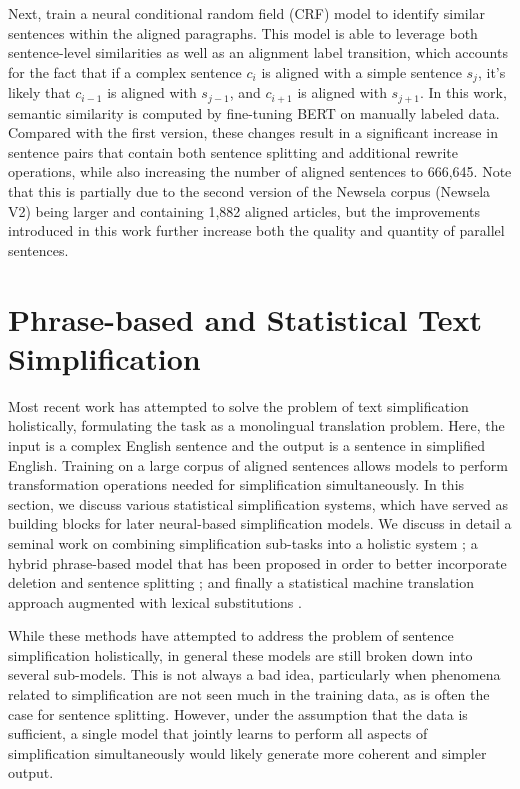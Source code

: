 \documentclass[thesis.tex]{subfiles}
\begin{document}
Next, \cite{jiang2020neural} train a neural conditional random field (CRF) model to identify similar sentences within the aligned paragraphs. This model is able to leverage both sentence-level similarities as well as an alignment label transition, which accounts for the fact that if a complex sentence $c_i$ is aligned with a simple sentence $s_j$, it's likely that $c_{i-1}$ is aligned with $s_{j-1}$, and $c_{i+1}$ is aligned with $s_{j+1}$. In this work, semantic similarity is computed by fine-tuning BERT \citep{devlin2019bert} on manually labeled data. Compared with the first version, these changes result in a significant increase in sentence pairs that contain both sentence splitting and additional rewrite operations, while also increasing the number of aligned sentences to 666,645. Note that this is partially due to the second version of the Newsela corpus (Newsela V2) being larger and containing 1,882 aligned articles, but the improvements introduced in this work further increase both the quality and quantity of parallel sentences.

\section{Phrase-based and Statistical Text Simplification} \label{sec:statistical_review}

Most recent work has attempted to solve the problem of text simplification holistically, formulating the task as a monolingual translation problem. Here, the input is a complex English sentence and the output is a sentence in simplified English. Training on a large corpus of aligned sentences allows models to perform transformation operations needed for simplification simultaneously. In this section, we discuss various statistical simplification systems, which have served as building blocks for later neural-based simplification models. We discuss in detail a seminal work on combining simplification sub-tasks into a holistic system \citep{zhu2010monolingual}; a hybrid phrase-based model that has been proposed in order to better incorporate deletion and sentence splitting \citep{narayan2014hybrid}; and finally a statistical machine translation approach augmented with lexical substitutions \citep{xu2016optimizing}.

While these methods have attempted to address the problem of sentence simplification holistically, in general these models are still broken down into several sub-models. This is not always a bad idea, particularly when phenomena related to simplification are not seen much in the training data, as is often the case for sentence splitting. However, under the assumption that the data is sufficient, a single model that jointly learns to perform all aspects of simplification simultaneously would likely generate more coherent and simpler output.
\end{document}
